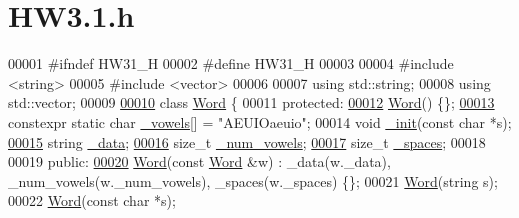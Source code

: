 \hypertarget{HW3_81_8h_source}{}\section{H\+W3.1.h}

\begin{DoxyCode}
00001 \textcolor{preprocessor}{#ifndef HW31\_H}
00002 \textcolor{preprocessor}{#define HW31\_H}
00003 
00004 \textcolor{preprocessor}{#include <string>}
00005 \textcolor{preprocessor}{#include <vector>}
00006 
00007 \textcolor{keyword}{using} std::string;
00008 \textcolor{keyword}{using} std::vector;
00009 
\hypertarget{HW3_81_8h_source.tex_l00010}{}\hyperlink{classWord}{00010} \textcolor{keyword}{class }\hyperlink{classWord}{Word} \{
00011   \textcolor{keyword}{protected}:
\hypertarget{HW3_81_8h_source.tex_l00012}{}\hyperlink{classWord_a17baf7109d46beb48d5b469f3baedc48}{00012}     \hyperlink{classWord_a17baf7109d46beb48d5b469f3baedc48}{Word}() \{\};
\hypertarget{HW3_81_8h_source.tex_l00013}{}\hyperlink{classWord_a5c77b083065c497224d3ad4b0b5958de}{00013}     constexpr \textcolor{keyword}{static} \textcolor{keywordtype}{char} \hyperlink{classWord_a5c77b083065c497224d3ad4b0b5958de}{\_vowels}[] = \textcolor{stringliteral}{"AEUIOaeuio"};
00014     \textcolor{keywordtype}{void} \hyperlink{classWord_a6a557d92243a1a4aa0f7a874b3c66a22}{\_init}(\textcolor{keyword}{const} \textcolor{keywordtype}{char} *s);
\hypertarget{HW3_81_8h_source.tex_l00015}{}\hyperlink{classWord_adc46545d81f0158074f941731ae5bb52}{00015}     \textcolor{keywordtype}{string} \hyperlink{classWord_adc46545d81f0158074f941731ae5bb52}{\_data};
\hypertarget{HW3_81_8h_source.tex_l00016}{}\hyperlink{classWord_a95a4914370c936b524ab21ff42177fb8}{00016}     \textcolor{keywordtype}{size\_t} \hyperlink{classWord_a95a4914370c936b524ab21ff42177fb8}{\_num\_vowels};
\hypertarget{HW3_81_8h_source.tex_l00017}{}\hyperlink{classWord_afffea82d937c3486011b409bcff4c938}{00017}     \textcolor{keywordtype}{size\_t} \hyperlink{classWord_afffea82d937c3486011b409bcff4c938}{\_spaces};
00018 
00019   \textcolor{keyword}{public}:
\hypertarget{HW3_81_8h_source.tex_l00020}{}\hyperlink{classWord_ac6f487c9336bcddcdca8d149d7c3ccb5}{00020}     \hyperlink{classWord_ac6f487c9336bcddcdca8d149d7c3ccb5}{Word}(\textcolor{keyword}{const} \hyperlink{classWord}{Word} &w) : \_data(w.\_data), \_num\_vowels(w.\_num\_vowels), \_spaces(w.\_spaces) \{\};
00021     \hyperlink{classWord_a17baf7109d46beb48d5b469f3baedc48}{Word}(\textcolor{keywordtype}{string} s);
00022     \hyperlink{classWord_a17baf7109d46beb48d5b469f3baedc48}{Word}(\textcolor{keyword}{const} \textcolor{keywordtype}{char} *s);

\end{DoxyCode}
